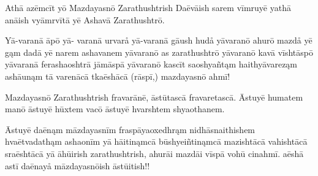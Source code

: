 \documentclass{book}
\begin{document}
\begin{pages}
\begin{Rightside}
Athā azēmcīt yō Mazdayasnō Zarathushtrish Daēvāish sarem vīmruyē yathā anāish vyāmrvītā yē Ashavā Zarathushtrō. 

Yā-varanā āpō yā- varanā urvarå yā-varanā gāush hudå yāvaranō ahurō mazdå yē gąm dadā yē narem ashavanem yāvaranō as zarathushtrō yāvaranō kavā vīshtāspō yāvaranā ferashaoshtrā jāmāspā yāvaranō kascīt saoshyañtąm haithyāvareząm ashāunąm tā varenācā tkaēshācā (rāspī,) mazdayasnō ahmī! 

Mazdayasnō Zarathushtrish fravarānē, āstūtascā fravaretascā. Āstuyē humatem manō āstuyē hūxtem vacō āstuyē hvarshtem shyaothanem. 

Āstuyē daēnąm māzdayasnīm fraspāyaoxedhrąm nidhāsnaithishem hvaētvadathąm ashaonīm yā hāitinąmcā būshyeiñtinąmcā mazishtācā vahishtācā sraēshtācā yā āhūirish zarathushtrish, ahurāi mazdāi vīspā vohū cinahmī. aēshā astī daēnayå māzdayasnōish āstūitish!! 

\endnumbering
\end{Rightside}

\end{pages}
\Pages
\end{document}
